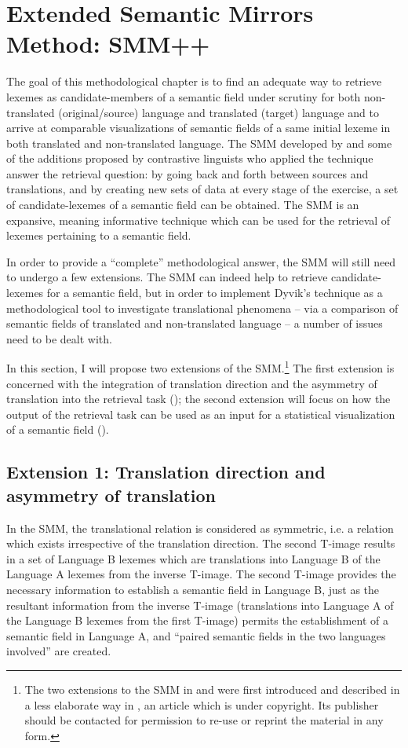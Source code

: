 \section{Extended Semantic Mirrors Method: SMM++}
\label{sec:3.5}
The goal of this methodological chapter is to find an adequate way to retrieve lexemes as candidate-members of a semantic field under scrutiny for both non-translated (original\slash source) language and translated (target) language and to arrive at comparable visualizations of semantic fields of a same initial lexeme in both translated and non-translated language. The SMM developed by \citet{johansson_translational_1998,langemets_translations_2005} and some of the additions proposed by contrastive linguists who applied the technique answer the retrieval question: by going back and forth between sources and translations, and by creating new sets of data at every stage of the exercise, a set of candidate-lexemes of a semantic field can be obtained. The SMM is an expansive, meaning informative technique which can be used for the retrieval of lexemes pertaining to a semantic field.

In order to provide a ``complete'' methodological answer, the SMM will still need to undergo a few extensions. The SMM can indeed help to retrieve candidate-lexemes for a semantic field, but in order to implement Dyvik’s technique as a methodological tool to investigate translational phenomena – via a comparison of semantic fields of translated and non-translated language – a number of issues need to be dealt with.

In this section, I will propose two extensions of the SMM.\footnote{The two extensions to the SMM in  and  were first introduced and described in a less elaborate way in \citet{vandevoorde_corpus-based_2017}, an article which is under copyright. Its publisher should be contacted for permission to re-use or reprint the material in any form.} The first extension is concerned with the integration of translation direction and the asymmetry of translation into the retrieval task (); the second extension will focus on how the output of the retrieval task can be used as an input for a statistical visualization of a semantic field ().

\subsection{Extension 1: Translation direction and asymmetry of translation}
\label{sec:3.5.1}
In the SMM, the translational relation is considered as symmetric, i.e. a relation which exists irrespective of the translation direction. The second T-image results in a set of Language B lexemes which are translations into Language B of the Language A lexemes from the inverse T-image. The second T-image provides the necessary information to establish a semantic field in Language B, just as the resultant information from the inverse T-image (translations into Language A of the Language B lexemes from the first T-image) permits the establishment of a semantic field in Language A, and “paired semantic fields in the two languages involved” \citep[33]{langemets_translations_2005} are created.

